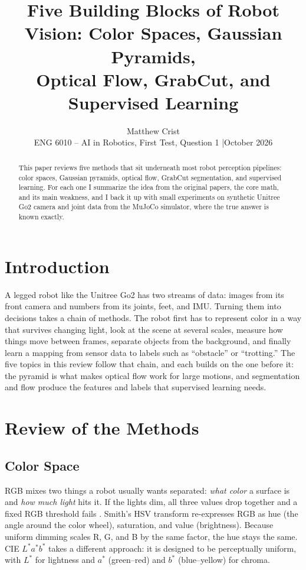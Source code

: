 \documentclass[11pt]{article}
\title{\vspace{-0.75in}\large\bfseries Five Building Blocks of Robot Vision: Color Spaces, Gaussian Pyramids,\\
Optical Flow, GrabCut, and Supervised Learning}
\author{Matthew Crist\\ \small ENG 6010 -- AI in Robotics, First Test, Question 1 \quad|\quad October 2026}
\date{}
\begin{document}
\maketitle
\vspace{-0.45in}

\begin{abstract}
\noindent This paper reviews five methods that sit underneath most robot perception pipelines: color spaces, Gaussian
pyramids, optical flow, GrabCut segmentation, and supervised learning. For each one I summarize the idea from the
original papers, the core math, and its main weakness, and I back it up with small experiments on synthetic Unitree Go2
camera and joint data from the MuJoCo simulator, where the true answer is known exactly.
\end{abstract}

\section{Introduction}
A legged robot like the Unitree Go2 has two streams of data: images from its front camera and numbers from its
joints, feet, and IMU. Turning them into decisions takes a chain of methods. The robot first has to
represent color in a way that survives changing light, look at the scene at several scales, measure how things move
between frames, separate objects from the background, and finally learn a mapping from sensor data to labels such as
``obstacle'' or ``trotting.'' The five topics in this review follow that chain, and each builds on the one before it: the pyramid
is what makes optical flow work for large motions, and segmentation and flow produce the features and labels that
supervised learning needs.

\section{Review of the Methods}

\subsection{Color Space}
RGB mixes two things a robot usually wants separated: \emph{what color} a surface is and \emph{how much light} hits
it. If the lights dim, all three values drop together and a fixed RGB threshold fails \cite{gonzalez}. Smith's HSV transform \cite{smith} re-expresses RGB as hue (the
angle around the color wheel), saturation, and value (brightness). Because uniform dimming scales R, G, and B by the same
factor, the hue stays the same. CIE $L^*a^*b^*$ \cite{cie} takes a different approach: it is designed to be perceptually
uniform, with $L^*$ for lightness and $a^*$ (green--red) and $b^*$ (blue--yellow) for chroma.
\end{document}
